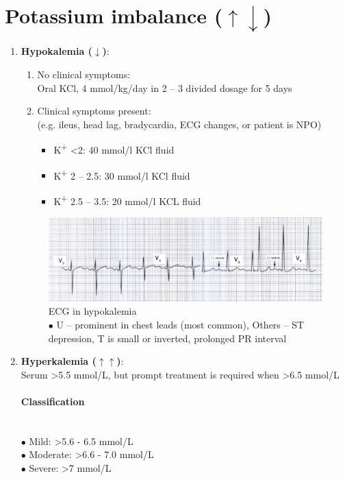 \documentclass[11pt,a4paper]{report}
\begin{document}
\section[Potassium imbalance]{Potassium imbalance ({\color{red}$\uparrow\downarrow$})}
\begin{enumerate}
	\item \textbf{Hypokalemia ($\downarrow$)}: 
	\begin{enumerate}
		\item No clinical symptoms: \\
		Oral KCl, 4 mmol/kg/day in 2 -- 3 divided dosage for 5 days 
		\item Clinical symptoms present:\\
		(e.g. ileus, head lag, bradycardia, ECG changes, or patient is NPO) \\
		\begin{itemize}[noitemsep]
			\item K\textsuperscript{+} \textless 2: 40 mmol/l KCl fluid
			\item K\textsuperscript{+} 2 -- 2.5: 30 mmol/l KCl fluid
			\item K\textsuperscript{+} 2.5 -- 3.5: 20 mmol/l KCL fluid
		\end{itemize}
	\end{enumerate}
	\begin{figure}[htp]
		\centering \includegraphics[scale=.94]{ecg-hypok.png}
		\centering \caption[Hypokalemia]{ECG in hypokalemia \\ $\bullet$ U -- prominent in chest leads (most common), Others -- ST depression, T is small or inverted, prolonged PR interval \cite{abdullah_ecg}}
		\label{ecg-hypoK}
	\end{figure}
	\newpage
	\item \textbf{Hyperkalemia ($\uparrow\uparrow$)}: \\
	Serum  \textgreater5.5 mmol/L, but prompt treatment is required when \textgreater6.5 mmol/L 
	\paragraph{Classification} ~\\
	$\bullet$ Mild: \textgreater5.6 - 6.5 mmol/L \\
	$\bullet$ Moderate: \textgreater6.6 - 7.0 mmol/L \\
	$\bullet$ Severe: \textgreater7 mmol/L 

\end{enumerate}
\end{document}
